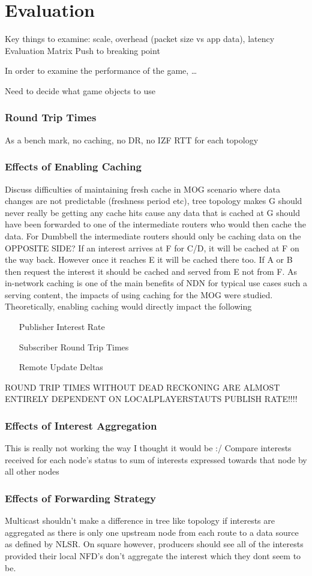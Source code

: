 \chapter{Evaluation}
Key things to examine: scale, overhead (packet size vs app data), latency
Evaluation Matrix
Push to breaking point

In order to examine the performance of the game, \dots

Need to decide what game objects to use

\subsection{Round Trip Times}
As a bench mark, no caching, no DR, no IZF RTT for each topology

\subsection{Effects of Enabling Caching}
Discuss difficulties of maintaining fresh cache in MOG scenario where data changes are not predictable (freshness period etc), tree topology makes G should never really be getting any cache hits cause any data that is cached at G should have been forwarded to one of the intermediate routers who would then cache the data. For Dumbbell the intermediate routers should only be caching data on the OPPOSITE SIDE? If an interest arrives at F for C/D, it will be cached at F on the way back. However once it reaches E it will be cached there too. If A or B  then request the interest it should be cached and served from E not from F. 
As in-network caching is one of the main benefits of NDN for typical use cases such a serving content, the impacts of using caching for the MOG were studied. Theoretically, enabling caching would directly impact the following


\begin{itemize}
    \item[Publisher Interest Rate]
    \item[Subscriber Round Trip Times]
    \item[Remote Update Deltas]  
\end{itemize}


ROUND TRIP TIMES WITHOUT DEAD RECKONING ARE ALMOST ENTIRELY DEPENDENT ON LOCALPLAYERSTAUTS PUBLISH RATE!!!!
\subsection{Effects of Interest Aggregation}
This is really not working the way I thought it would be :/
Compare interests received for each node's status to sum of interests expressed towards that node by all other nodes


\subsection{Effects of Forwarding Strategy}
Multicast shouldn't make a difference in tree like topology if interests are aggregated as there is only one upstream node from each route to a data source as defined by NLSR. On square however, producers should see all of the interests provided their local NFD's don't aggregate the interest which they dont seem to be.